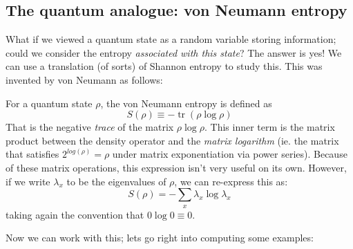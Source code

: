 \documentclass[a4paper,12pt]{article}
\begin{document}
\subsection{The quantum analogue: von Neumann entropy}

What if we viewed a quantum state as a random variable storing information;
could we consider the entropy \emph{associated with this state}?
The answer is yes!
We can use a translation (of sorts) of Shannon entropy to study this.
This was invented by von Neumann as follows:

 {
    For a quantum state $\rho$, the von Neumann entropy is defined as
    $$S(\rho) \equiv -\operatorname{tr}(\rho\log\rho)$$
}
That is the negative \emph{trace} of the matrix $\rho\log\rho$. This inner term is the matrix product between the density operator and the \emph{matrix logarithm} (ie. the matrix that satisfies $2^{log(\rho)}=\rho$ under matrix exponentiation via power series).
Because of these matrix operations, this expression isn't very useful on its own.
However, if we write $\lambda_x$ to be the eigenvalues of $\rho$, we can re-express this as:
$$S(\rho)=-\sum_x \lambda_x\log\lambda_x$$
taking again the convention that $0\log0 \equiv 0$.

Now we can work with this; lets go right into computing some examples:
\end{document}
